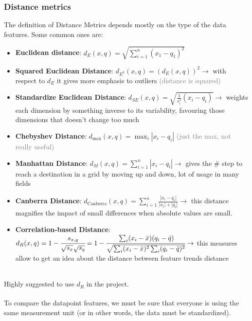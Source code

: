 \subsubsection*{Distance metrics}
The definition of Distance Metrics depends mostly on the type of the data features.
Some common ones are:
\begin{itemize}
    \item \textbf{Euclidean distance}: $d_E(x,q)=\sqrt{\sum_{i=1}^n(x_1-q_1)^2}$

    \item \textbf{Squared Euclidean Distance}: $d_{E^2}(x,q)=(d_E(x,q))^2 
    \rightarrow$ with respect to $d_E$ it gives more emphasis to outliers 
    \textcolor{gray}{(distance is squared)}

    \item \textbf{Standardize Euclidean Distance}: $d_{SE}(x,q)=\sqrt{\frac{1}
    {s_i^2}(x_i-q_i)} \rightarrow$ weights each dimension by something inverse
    to its variability, favouring those dimensions that doesn't change too much

    \item \textbf{Chebyshev Distance}: $d_ {\max}(x,q)=\max_i|x_i-q_i|$ 
    \textcolor{gray}{(just the max, not really useful)}

    \item \textbf{Manhattan Distance}: $d_M(x,q)=\sum_{i=1}^n|x_i-q_i| \rightarrow$
    gives the \# step to reach a destination in a grid by moving up and down, lot of
    usage in many fields

    \item \textbf{Canberra Distance}: $d_{\text{Canberra}}(x, q) = \sum_{i=1}^{n} \frac{|x_i - q_i|}{|x_i| + |q_i|} \rightarrow$ this distance magnifies the impact of small differences when absolute values are small.

    \item \textbf{Correlation-based Distance}: $d_R(x,q)=1-\cfrac{s_{x,q}}{\sqrt{s_x}
    \sqrt{s_q}}=1-\cfrac{\sum_i(x_i-\bar{x})(q_i-\bar{q})}{\sqrt{\sum_i(x_i-\bar{x})
    ^2\sum_i(q_i-\bar{q})^2}} \rightarrow$ this measures allow to get an idea about
    the distance between feature trends distance 
\end{itemize}
\hfill \\
Highly suggested to use $d_R$ in the project.\\
\hfill \\
To compare the datapoint features, we must be sure that everyone is using the same
measurement unit (or in other words, the data must be standardized).

